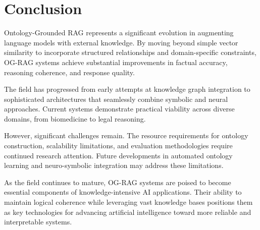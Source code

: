 \documentclass[12pt]{report}
\begin{document}
\section{Conclusion}

Ontology-Grounded RAG represents a significant evolution in augmenting language models with external knowledge. By moving beyond simple vector similarity to incorporate structured relationships and domain-specific constraints, OG-RAG systems achieve substantial improvements in factual accuracy, reasoning coherence, and response quality.

The field has progressed from early attempts at knowledge graph integration to sophisticated architectures that seamlessly combine symbolic and neural approaches. Current systems demonstrate practical viability across diverse domains, from biomedicine to legal reasoning.

However, significant challenges remain. The resource requirements for ontology construction, scalability limitations, and evaluation methodologies require continued research attention. Future developments in automated ontology learning and neuro-symbolic integration may address these limitations.

As the field continues to mature, OG-RAG systems are poised to become essential components of knowledge-intensive AI applications. Their ability to maintain logical coherence while leveraging vast knowledge bases positions them as key technologies for advancing artificial intelligence toward more reliable and interpretable systems.

\printbibliography
\end{document}
